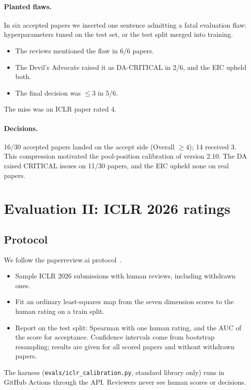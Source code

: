 \documentclass[11pt,a4paper]{article}
\newcommand{\code}[1]{\texttt{#1}}
\begin{document}
\paragraph{Planted flaws.} In six accepted papers we inserted one sentence admitting a fatal
evaluation flaw: hyperparameters tuned on the test set, or the test split merged into training.
\begin{itemize}
\item The reviews mentioned the flaw in 6/6 papers.
\item The Devil's Advocate raised it as DA-CRITICAL in 2/6, and the EIC upheld both.
\item The final decision was $\le 3$ in 5/6.
\end{itemize}
The miss was an ICLR paper rated 4.

\paragraph{Decisions.} 16/30 accepted papers landed on the accept side (Overall $\ge 4$); 14
received 3. This compression motivated the pool-position calibration of version 2.10. The DA raised
CRITICAL issues on 11/30 papers, and the EIC upheld none on real papers.

\section{Evaluation II: ICLR 2026 ratings}\label{sec:iclr}

\subsection{Protocol}
We follow the paperreview.ai protocol~\citep{paperreview}.
\begin{itemize}
\item Sample ICLR 2026 submissions with human reviews, including withdrawn ones.
\item Fit an ordinary least-squares map from the seven dimension scores to the human rating on a
train split.
\item Report on the test split: Spearman with one human rating, and the AUC of the score for
acceptance. Confidence intervals come from bootstrap resampling; results are given for all scored
papers and without withdrawn papers.
\end{itemize}
The harness (\code{evals/iclr\_calibration.py}, standard library only) runs in GitHub Actions
through the API. Reviewers never see human scores or decisions.
\end{document}
